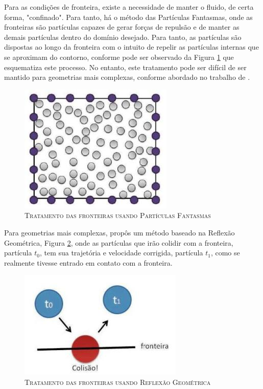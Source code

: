 Para as condições de fronteira, existe a necessidade de manter o fluido, de certa forma, "confinado". Para tanto, há o método das Partículas Fantasmas, onde as fronteiras são partículas capazes de gerar forças de repulsão e de manter as demais partículas dentro do domínio desejado. Para tanto, as partículas são dispostas ao longo da fronteira com o intuito de repelir as partículas internas que se aproximam do contorno, conforme pode ser observado da Figura \ref{fig:particula_fantasma} que esquematiza este processo. No entanto, este tratamento pode ser difícil de ser mantido para geometrias mais complexas, conforme abordado no trabalho de .
\begin{figure}[H]
	\centering
	\includegraphics[scale=1]{figuras/particula_fantasma.jpg}
	\caption{\textsc{Tratamento das fronteiras usando Partículas Fantasmas}}
	\vspace{-0.1cm}
	\label{fig:particula_fantasma}
\end{figure} 

Para geometrias mais complexas,  propôs um método baseado na Reflexão Geométrica, Figura \ref{fig:colisao}, onde as partículas que irão colidir com a fronteira, partícula $t_0$, tem sua trajetória e velocidade corrigida, partícula $t_1$, como se realmente tivesse entrado em contato com a fronteira.
\begin{figure}[H]
	\centering
	\includegraphics[scale=1]{figuras/colisao.jpg}
	\caption{\textsc{Tratamento das fronteiras usando Reflexão Geométrica}}
	\vspace{-0.1cm}
	\label{fig:colisao}
\end{figure}  

